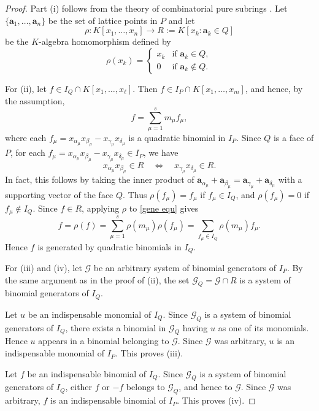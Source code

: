\documentclass[10pt,a4paper]{amsart}
\numberwithin{thm}{section}
\numberwithin{equation}{section}
\def\ab{{\mathbf a}}
\begin{document}
\begin{proof}
    Part (i) follows from the theory of combinatorial pure subrings \cite[Theorem 1.3]{cpureR1}.
Let $\{\ab_1,\dots, \ab_n\}$ be the set of lattice points in $P$
and let
\[
\rho:K[x_1,\ldots,x_n]\longrightarrow R:=K[x_k : \ab_k\in Q]
\]
be the \(K\)-algebra homomorphism defined by
\[
\rho(x_k)=
\begin{cases}
x_k & \text{if } \ab_k\in Q,\\
0 & \text{if } \ab_k\notin Q.
\end{cases}
\]


    
For (ii), let \(f\in I_Q\cap K[x_1,\ldots,x_\ell]\). 
Then
\(f\in I_P\cap K[x_1,\ldots,x_m]\), and hence, by the assumption,
\begin{equation} \label{gene equ}
    f=\sum_{\mu=1}^s m_\mu f_\mu,
\end{equation}
where each \(f_\mu=x_{\alpha_\mu} x_{\beta_\mu} - x_{\gamma_\mu} x_{\delta_\mu} \)
is a quadratic binomial in \(I_P\).
Since \(Q\) is a face of \(P\), for each  \(f_\mu=x_{\alpha_\mu} x_{\beta_\mu} - x_{\gamma_\mu} x_{\delta_\mu}\in I_P\),
we have
\[
x_{\alpha_\mu} x_{\beta_\mu}\in R \quad \Longleftrightarrow \quad   x_{\gamma_\mu} x_{\delta_\mu}\in R.
\]
In fact, this follows by taking the inner product of $\ab_{\alpha_\mu} +\ab_{\beta_\mu} =\ab_{\gamma_\mu} +\ab_{\delta_\mu}$ with a supporting vector of the face \(Q\).
Thus \(\rho(f_\mu)=f_\mu\) if \(f_\mu\in I_Q\), and  \(\rho(f_\mu)=0\)
if \(f_\mu\notin I_Q\).
Since \(f\in R\), applying \(\rho\) to  \eqref{gene equ} gives
\[
f=\rho(f)
=\sum_{\mu=1}^s \rho(m_\mu)\rho(f_\mu)
=\sum_{f_\mu \in I_Q} \rho(m_\mu) f_\mu.
\]
Hence \(f\) is generated by quadratic binomials in \(I_Q\).

For (iii) and (iv), let $\mathcal{G}$ be an arbitrary system of binomial generators of $I_P$. By the same argument as in the proof of (ii), the set $\mathcal{G}_Q = \mathcal{G} \cap R$ is a system of binomial generators of $I_Q$.

Let $u$ be an indispensable monomial of $I_Q$. Since $\mathcal{G}_Q$ is a system of binomial generators of $I_Q$, there exists a binomial in $\mathcal{G}_Q$ having $u$ as one of its monomials. Hence $u$ appears in a binomial belonging to $\mathcal{G}$. Since $\mathcal{G}$ was arbitrary, $u$ is an indispensable monomial of $I_P$. This proves (iii). 

Let $f$ be an indispensable binomial of $I_Q$. Since $\mathcal{G}_Q$ is a system of binomial generators of $I_Q$, either $f$ or $-f$ belongs to $\mathcal{G}_Q$, and hence to $\mathcal{G}$. Since $\mathcal{G}$ was arbitrary, $f$ is an indispensable binomial of $I_P$. This proves (iv).
\end{proof}
\end{document}
